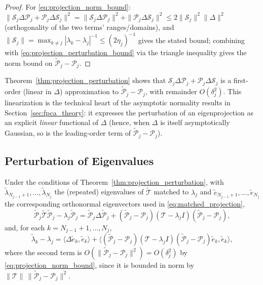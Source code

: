 \begin{proof}
For \eqref{eq:projection_norm_bound}: $\|\mathcal{S}_j\Delta\mathcal{P}_j+
\mathcal{P}_j\Delta\mathcal{S}_j\|^2 = \|\mathcal{S}_j\Delta\mathcal{P}_j
\|^2+\|\mathcal{P}_j\Delta\mathcal{S}_j\|^2 \leq 2\|\mathcal{S}_j\|^2
\|\Delta\|^2$ (orthogonality of the two terms' ranges/domains), and
$\|\mathcal{S}_j\|=\max_{k\neq j}|\lambda_k-\lambda_j|^{-1}\leq(2\eta_j)^{-1}$
gives the stated bound; combining with
\eqref{eq:projection_perturbation_bound} via the triangle inequality gives
the norm bound on $\widetilde{\mathcal{P}}_j-\mathcal{P}_j$.
\end{proof}

Theorem~\ref{thm:projection_perturbation} shows that
$\mathcal{S}_j\Delta\mathcal{P}_j+\mathcal{P}_j\Delta\mathcal{S}_j$ is a
first-order (linear in $\Delta$) approximation to
$\widetilde{\mathcal{P}}_j-\mathcal{P}_j$, with remainder $O(\delta_j^2)$.
This linearization is the technical heart of the asymptotic normality
results in Section~\ref{sec:fpca_theory}: it expresses the perturbation of
an eigenprojection as an explicit \emph{linear} functional of $\Delta$
(hence, when $\Delta$ is itself asymptotically Gaussian, so is the
leading-order term of $\widetilde{\mathcal{P}}_j-\mathcal{P}_j$).

\subsection{Perturbation of Eigenvalues}
\label{subsec:eigenvalue_perturbation}

\begin{theorem}
\label{thm:eigenvalue_perturbation_exact}
Under the conditions of Theorem~\ref{thm:projection_perturbation}, with
$\widetilde\lambda_{N_{j-1}+1},\dots,\widetilde\lambda_{N_j}$ the (repeated)
eigenvalues of $\widetilde{\mathcal{T}}$ matched to $\lambda_j$ and
$\widetilde{e}_{N_{j-1}+1},\dots,\widetilde{e}_{N_j}$ the corresponding
orthonormal eigenvectors used in \eqref{eq:matched_projection},
\begin{equation}
\widetilde{\mathcal{P}}_j\widetilde{\mathcal{T}}\widetilde{\mathcal{P}}_j -
\lambda_j\widetilde{\mathcal{P}}_j = \widetilde{\mathcal{P}}_j\Delta
\widetilde{\mathcal{P}}_j + (\widetilde{\mathcal{P}}_j-\mathcal{P}_j)
(\mathcal{T}-\lambda_jI)(\widetilde{\mathcal{P}}_j-\mathcal{P}_j),
\label{eq:eigenvalue_perturbation_operator}
\end{equation}
and, for each $k=N_{j-1}+1,\dots,N_j$,
\begin{equation}
\widetilde\lambda_k - \lambda_j = \langle\Delta\widetilde{e}_k,
\widetilde{e}_k\rangle + \big\langle(\widetilde{\mathcal{P}}_j-\mathcal{P}_j)
(\mathcal{T}-\lambda_jI)(\widetilde{\mathcal{P}}_j-\mathcal{P}_j)
\widetilde{e}_k,\widetilde{e}_k\big\rangle,
\label{eq:eigenvalue_perturbation_exact}
\end{equation}
where the second term is $O(\|\widetilde{\mathcal{P}}_j-\mathcal{P}_j\|^2)
= O(\delta_j^2)$ by \eqref{eq:projection_norm_bound}, since it is bounded
in norm by $\|\mathcal{T}\|\,\|\widetilde{\mathcal{P}}_j-\mathcal{P}_j\|^2$.
\end{theorem}

